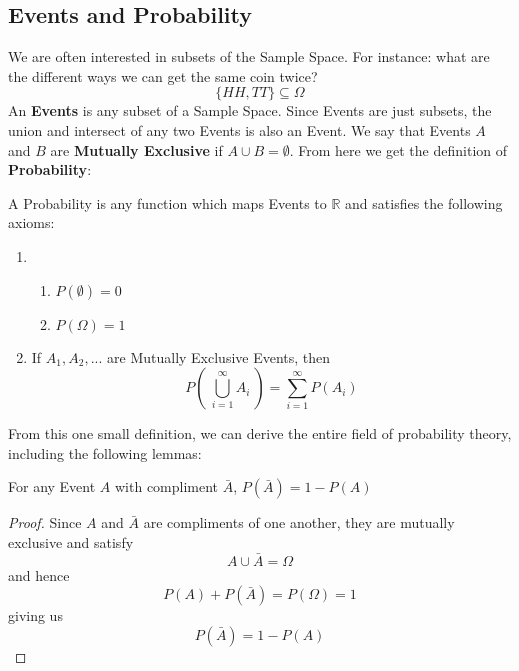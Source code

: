 \subsection{Events and Probability}
We are often interested in subsets of the Sample Space. For instance: what are the different ways we can get the same coin twice?
\[
    \{HH,TT\}\subseteq \Omega
\]
An \textbf{Events} is any subset of a Sample Space. Since Events are just subsets, the union and intersect of any two Events is also an Event. We say that Events $A$ and $B$ are \textbf{Mutually Exclusive} if $A\cup B=\emptyset$. From here we get the definition of \textbf{Probability}:
\begin{definition}[Probability]
\label{def:probability}
A Probability is any function which maps Events to $\mathbb R$ and satisfies the following axioms:
\begin{enumerate}
    \item 
    \begin{enumerate}
        \item $P(\emptyset) = 0$
        \item $P(\Omega)=1$
    \end{enumerate}
    \item If $A_1, A_2,...$ are Mutually Exclusive Events, then
    \[
        P\left(\ \bigcup_{i=1}^\infty A_i\ \right) = \sum_{i=1}^\infty P(A_i)
    \]
\end{enumerate}
\end{definition}
From this one small definition, we can derive the entire field of probability theory, including the following lemmas:
\begin{lemma}
\label{lem:probability_of_a_compliment}
    For any Event $A$ with compliment $\bar A$, $P(\bar A)=1-P(A)$
\begin{proof}
    Since $A$ and $\bar A$ are compliments of one another, they are mutually exclusive and satisfy
    \[
        A\cup \bar A = \Omega
    \]
    and hence
    \[
        P(A)+P(\bar A) = P(\Omega) = 1
    \]
    giving us
    \[
        P(\bar A)=1-P(A)
    \]
\end{proof}
\end{lemma}

